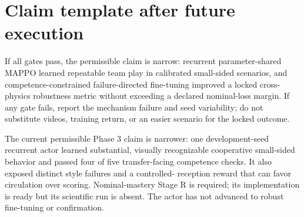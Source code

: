 \documentclass[12pt,twocolumn]{article}
\begin{document}
\section{Claim template after future execution}
If all gates pass, the permissible claim is narrow: recurrent parameter-shared MAPPO learned
repeatable team play in calibrated small-sided scenarios, and competence-constrained
failure-directed fine-tuning improved a locked cross-physics robustness metric without exceeding a
declared nominal-loss margin. If any gate fails, report the mechanism failure and seed variability;
do not substitute videos, training return, or an easier scenario for the locked outcome.

The current permissible Phase 3 claim is narrower: one development-seed recurrent actor learned
substantial, visually recognizable cooperative small-sided behavior and passed four of five
transfer-facing competence checks. It also exposed distinct style failures and a controlled-
reception reward that can favor circulation over scoring. Nominal-mastery Stage R is required;
its implementation is ready but its scientific run is absent. The actor has not advanced to
robust fine-tuning or confirmation.
\end{document}
